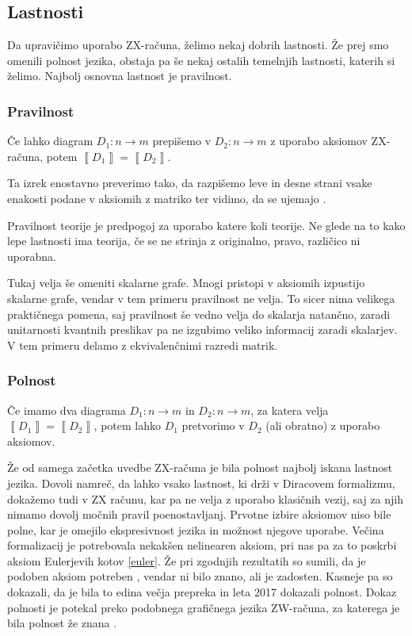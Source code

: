\documentclass[mat1]{fmfdelo}
\newcommand{\interpret}[1]{\left\llbracket #1 \right\rrbracket}
\begin{document}
\subsection{Lastnosti}
Da upravičimo uporabo ZX-računa, želimo nekaj dobrih lastnosti. Že prej smo omenili polnost jezika, obstaja pa še nekaj ostalih temelnjih lastnosti, katerih si želimo. Najbolj osnovna lastnost je pravilnost.
\subsubsection{Pravilnost}
\begin{izrek}[Pravilnost]
    Če lahko diagram \(D_1:n\to m\) prepišemo v \(D_2:n\to m\) z uporabo aksiomov ZX-računa, potem \(\interpret{D_1} = \interpret{D_2}\).
\end{izrek}
Ta izrek enostavno preverimo tako, da razpišemo leve in desne strani vsake enakosti podane v aksiomih z matriko ter vidimo, da se ujemajo \cite[izrek 2.16]{Coecke_2011}.

Pravilnost teorije je predpogoj za uporabo katere koli teorije. Ne glede na to kako lepe lastnosti ima teorija, če se ne strinja z originalno, pravo, različico ni uporabna.

Tukaj velja še omeniti skalarne grafe. Mnogi pristopi v aksiomih izpustijo skalarne grafe, vendar v tem primeru pravilnost ne velja. To sicer nima velikega praktičnega pomena, saj pravilnost še vedno velja do skalarja natančno, zaradi unitarnosti kvantnih preslikav pa ne izgubimo veliko informacij zaradi skalarjev. V tem primeru delamo z ekvivalenčnimi razredi matrik.
\subsubsection{Polnost}
\begin{izrek}[Polnost]
    Če imamo dva diagrama \(D_1:n\to m\) in \(D_2:n\to m\), za katera velja \(\interpret{D_1} = \interpret{D_2}\), potem lahko \(D_1\) pretvorimo v \(D_2\) (ali obratno) z uporabo aksiomov.
\end{izrek}
Že od samega začetka uvedbe ZX-računa je bila polnost najbolj iskana lastnost jezika. Dovoli namreč, da lahko vsako lastnost, ki drži v Diracovem formalizmu, dokažemo tudi v ZX računu, kar pa ne velja z uporabo klasičnih vezij, saj za njih nimamo dovolj močnih pravil poenostavljanj. Prvotne izbire aksiomov niso bile polne, kar je omejilo ekspresivnost jezika in možnost njegove uporabe. Večina formalizacij je potrebovala nekakšen nelinearen aksiom, pri nas pa za to poskrbi aksiom Eulerjevih kotov \ref{euler}. Že pri zgodnjih rezultatih so sumili, da je podoben aksiom potreben \cite{Schr_der_de_Witt_2014}, vendar ni bilo znano, ali je zadosten. Kasneje pa so dokazali, da je bila to edina večja prepreka in leta 2017 dokazali polnost. Dokaz polnosti je potekal preko podobnega grafičnega jezika ZW-računa, za katerega je bila polnost že znana \cite{kangfengng}.
\end{document}

